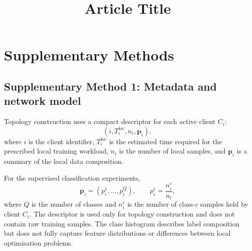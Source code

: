 \documentclass[pdflatex,sn-mathphys-num]{sn-jnl}
\begin{document}
\title[Article Title]{Article Title}

\author[1,2]{ }

\author[2,3]{ }

\author*[1,2]{ }










\maketitle



\appendix


\section{Supplementary Methods}

\subsection{Supplementary Method 1: Metadata and network model}
\label{supp:metadata_and_network}

Topology construction uses a compact descriptor for each active client \(C_i\):
\[
\left(
i,
T_i^{\mathrm{loc}},
n_i,
\mathbf{p}_i
\right),
\]
where \(i\) is the client identifier, \(T_i^{\mathrm{loc}}\) is the estimated time required for the prescribed local training workload, \(n_i\) is the number of local samples, and \(\mathbf{p}_i\) is a summary of the local data composition.

For the supervised classification experiments,
\[
\mathbf{p}_i
=
\left(
p_i^1,\ldots,p_i^Q
\right),
\qquad
p_i^c
=
\frac{n_i^c}{n_i},
\]
where \(Q\) is the number of classes and \(n_i^c\) is the number of class-\(c\) samples held by client \(C_i\). The descriptor is used only for topology construction and does not contain raw training samples. The class histogram describes label composition but does not fully capture feature distributions or differences between local optimisation problems.
\end{document}
